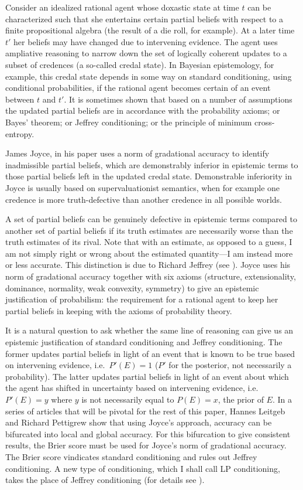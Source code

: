 \documentclass[smallextended]{svjour3}       %
\begin{document}
Consider an idealized rational agent whose doxastic state at time $t$
can be characterized such that she entertains certain partial beliefs
with respect to a finite propositional algebra (the result of a die
roll, for example). At a later time $t'$ her beliefs may have changed
due to intervening evidence. The agent uses ampliative reasoning to
narrow down the set of logically coherent updates to a subset of
credences (a so-called credal state). In Bayesian epistemology, for
example, this credal state depends in some way on standard
conditioning, using conditional probabilities, if the rational agent
becomes certain of an event between $t$ and $t'$. It is sometimes
shown that based on a number of assumptions the updated partial
beliefs are in accordance with the probability axioms; or Bayes'
theorem; or Jeffrey conditioning; or the principle of minimum
cross-entropy.

James Joyce, in his paper  uses a norm of gradational accuracy to identify
inadmissible partial beliefs, which are demonstrably inferior in
epistemic terms to those partial beliefs left in the updated credal
state. Demonstrable inferiority in Joyce is usually based on
supervaluationist semantics, when for example one credence is more
truth-defective than another credence in all possible worlds.

A set of partial beliefs can be genuinely defective in epistemic terms
compared to another set of partial beliefs if its truth estimates are
necessarily worse than the truth estimates of its rival. Note that
with an estimate, as opposed to a guess, I am not simply right or
wrong about the estimated quantity---I am instead more or less
accurate. This distinction is due to Richard Jeffrey (see
). Joyce uses his norm of gradational accuracy
together with six axioms (structure, extensionality, dominance,
normality, weak convexity, symmetry) to give an epistemic
justification of probabilism: the requirement for a rational agent to
keep her partial beliefs in keeping with the axioms of probability
theory.

It is a natural question to ask whether the same line of reasoning can
give us an epistemic justification of standard conditioning and
Jeffrey conditioning. The former updates partial beliefs in light of
an event that is known to be true based on intervening evidence, i.e.\
$P'(E)=1$ ($P'$ for the posterior, not necessarily a probability). The
latter updates partial beliefs in light of an event about which the
agent has shifted in uncertainty based on intervening evidence, i.e.\
$P'(E)=y$ where $y$ is not necessarily equal to $P(E)=x$, the prior of
$E$. In a series of articles that will be pivotal for the rest of this
paper, Hannes Leitgeb and Richard Pettigrew show that using Joyce's
approach, accuracy can be bifurcated into local and global accuracy.
For this bifurcation to give consistent results, the Brier score must
be used for Joyce's norm of gradational accuracy. The Brier score
vindicates standard conditioning and rules out Jeffrey conditioning. A
new type of conditioning, which I shall call LP conditioning, takes
the place of Jeffrey conditioning (for details see
\scite{7}{leitgebpettigrew10i}{}).
\end{document}
